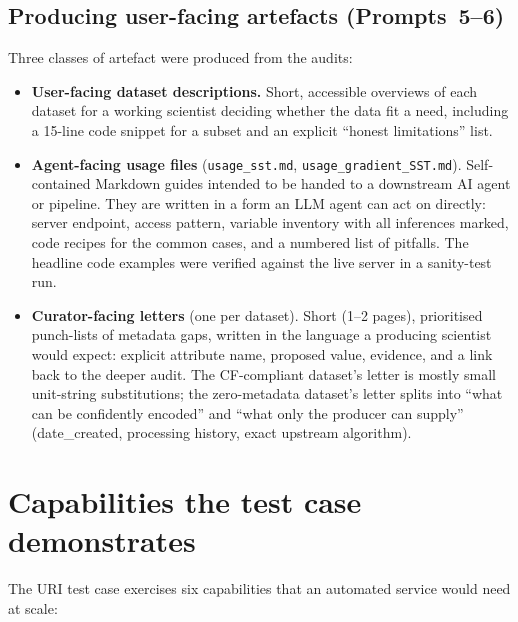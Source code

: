 \documentclass[11pt]{article}
\begin{document}
\subsection{Producing user-facing artefacts (Prompts~5--6)}

Three classes of artefact were produced from the audits:

\begin{itemize}[topsep=2pt]
  \item \textbf{User-facing dataset descriptions.} Short, accessible
    overviews of each dataset for a working scientist deciding
    whether the data fit a need, including a 15-line code snippet
    for a subset and an explicit ``honest limitations'' list.
  \item \textbf{Agent-facing usage files} (\texttt{usage\_sst.md},
    \texttt{usage\_gradient\_SST.md}). Self-contained Markdown
    guides intended to be handed to a downstream AI agent or
    pipeline. They are written in a form an LLM agent can act on
    directly: server endpoint, access pattern, variable inventory
    with all inferences marked, code recipes for the common cases,
    and a numbered list of pitfalls. The headline code examples
    were verified against the live server in a sanity-test run.
  \item \textbf{Curator-facing letters} (one per dataset). Short
    (1--2 pages), prioritised punch-lists of metadata gaps,
    written in the language a producing scientist would expect:
    explicit attribute name, proposed value, evidence, and a
    link back to the deeper audit. The CF-compliant dataset's
    letter is mostly small unit-string substitutions; the
    zero-metadata dataset's letter splits into ``what can be
    confidently encoded'' and ``what only the producer can
    supply'' (date\_created, processing history, exact upstream
    algorithm).
\end{itemize}

\section{Capabilities the test case demonstrates}\label{sec:caps}

The URI test case exercises six capabilities that an automated
service would need at scale:
\end{document}
